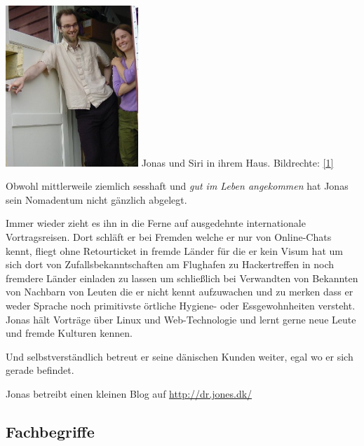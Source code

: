 \begin{center}
\includegraphics[width=5cm]{nomad/nomad-siri.jpg}
\footnotesize{Jonas und Siri in ihrem Haus. Bildrechte: \href{http://dr.jones.dk}{{[}1{]}}}
\end{center}

Obwohl mittlerweile ziemlich sesshaft und \emph{gut im Leben angekommen} hat Jonas sein Nomadentum nicht gänzlich abgelegt.

Immer wieder  zieht es ihn in die Ferne auf ausgedehnte internationale Vortragsreisen. Dort schläft er bei Fremden welche er nur von Online-Chats kennt, fliegt ohne Retourticket in fremde Länder für die er kein Visum hat um sich dort von Zufallsbekanntschaften am Flughafen zu Hackertreffen in noch fremdere Länder einladen zu lassen um schließlich bei Verwandten von Bekannten von Nachbarn von Leuten die er nicht kennt aufzuwachen und zu merken dass er weder Sprache noch primitivste örtliche Hygiene- oder Essgewohnheiten versteht. Jonas hält  Vorträge über Linux und Web-Technologie und lernt gerne neue Leute und fremde Kulturen kennen.

Und selbstverständlich betreut er seine dänischen Kunden weiter, egal wo er sich gerade befindet.

Jonas betreibt einen kleinen Blog auf \url{http://dr.jones.dk/} 



\subsection*{Fachbegriffe}

